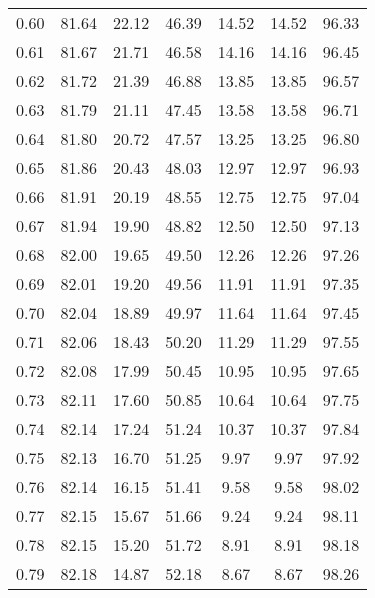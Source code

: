 \begin{tabular}{|c|c|c|c|c|c|c|}
      0.60 &     81.64 &     22.12 &      46.39 &   14.52 &      14.52 &         96.33 \\
      0.61 &     81.67 &     21.71 &      46.58 &   14.16 &      14.16 &         96.45 \\
      0.62 &     81.72 &     21.39 &      46.88 &   13.85 &      13.85 &         96.57 \\
      0.63 &     81.79 &     21.11 &      47.45 &   13.58 &      13.58 &         96.71 \\
      0.64 &     81.80 &     20.72 &      47.57 &   13.25 &      13.25 &         96.80 \\
      0.65 &     81.86 &     20.43 &      48.03 &   12.97 &      12.97 &         96.93 \\
      0.66 &     81.91 &     20.19 &      48.55 &   12.75 &      12.75 &         97.04 \\
      0.67 &     81.94 &     19.90 &      48.82 &   12.50 &      12.50 &         97.13 \\
      0.68 &     82.00 &     19.65 &      49.50 &   12.26 &      12.26 &         97.26 \\
      0.69 &     82.01 &     19.20 &      49.56 &   11.91 &      11.91 &         97.35 \\
      0.70 &     82.04 &     18.89 &      49.97 &   11.64 &      11.64 &         97.45 \\
      0.71 &     82.06 &     18.43 &      50.20 &   11.29 &      11.29 &         97.55 \\
      0.72 &     82.08 &     17.99 &      50.45 &   10.95 &      10.95 &         97.65 \\
      0.73 &     82.11 &     17.60 &      50.85 &   10.64 &      10.64 &         97.75 \\
      0.74 &     82.14 &     17.24 &      51.24 &   10.37 &      10.37 &         97.84 \\
      0.75 &     82.13 &     16.70 &      51.25 &    9.97 &       9.97 &         97.92 \\
      0.76 &     82.14 &     16.15 &      51.41 &    9.58 &       9.58 &         98.02 \\
      0.77 &     82.15 &     15.67 &      51.66 &    9.24 &       9.24 &         98.11 \\
      0.78 &     82.15 &     15.20 &      51.72 &    8.91 &       8.91 &         98.18 \\
      0.79 &     82.18 &     14.87 &      52.18 &    8.67 &       8.67 &         98.26 \\

\end{tabular}
